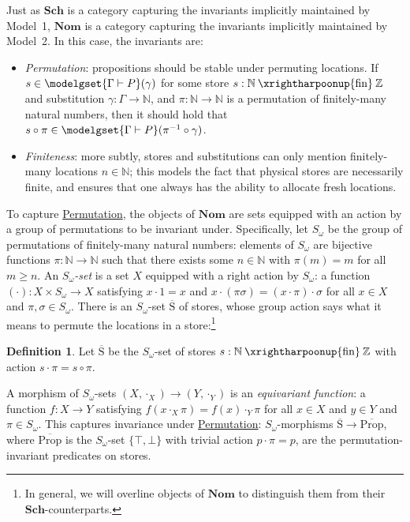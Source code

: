 \documentclass[
  sigconf,
  screen, ]{acmart}
\makeatletter
\theoremstyle{definition}
\newtheorem{definition}[theorem]{Definition}
\newcommand\N{\mathbb N}
\newcommand\Z{\mathbb Z}
\newcommand{\labelword}[2]{\phantomsection
  #1\def\@currentlabel{\unexpanded{#1}}\label{#2}}
\newcommand\nref[2]{\hyperref[#1]{#2}} \newcommand\checkhigh{{\huge{\color{red}\textbf{TODO: check}}}}
\newcommand\vtrue{\top}
\newcommand\vfalse{\bot}
\newcommand\Sch{{\nref{def:Sch}{\mathbf{Sch}}}}
\newcommand\nomgrp{{\nref{def:nomgrp}{S_\omega}}}
\newcommand\Nom{{\nref{def:Nom}{\mathbf{Nom}}}}
\newcommand\nomstore{\mathbin{\xrightharpoonup{\rm fin}}}
\newcommand\nomProp{{\nref{def:nomProp}{\overline{\mathrm{Prop}}}}}
\newcommand\nomStore{{\nref{def:nomStore}{\overline{\mathrm{S}}}}}
\makeatother
\begin{document}
Just as $\Sch$ is a category capturing the invariants
implicitly maintained by Model~1,
$\Nom$ is a category
capturing the invariants implicitly maintained
by Model~2.
In this case, the invariants are:
\newcommand\Permutation{{\nref{def:Permutation}{Permutation}}}
\newcommand\Finiteness{{\nref{def:Finiteness}{Finiteness}}}
\begin{itemize}[leftmargin=*]
  \item \emph{\labelword{Permutation}{def:Permutation}}:
    propositions should be stable under permuting locations.
    If $s\in\modelgset{\Gamma\vdash P}(\gamma)$
    for some store $s : \N\nomstore\Z$ and substitution $\gamma : \Gamma\to \N$,
    and $\pi : \N\to\N$ is a permutation of finitely-many natural numbers,
    then it should hold that $s\circ \pi \in \modelgset{\Gamma\vdash P}(\pi^{-1}\circ \gamma)$.
  \item \emph{\labelword{Finiteness}{def:Finiteness}}: more subtly,
    stores and substitutions
    can only mention finitely-many locations $n\in\N$;
    this models the fact that physical stores are necessarily finite,
    and ensures that one always has the ability to allocate fresh locations.
\end{itemize}
To capture \Permutation{}, the objects of $\Nom$
are sets equipped with an action by a group of permutations to be invariant under.
  \labelword{Specifically}{def:nomgrp}, let $\nomgrp$ be the
  group of permutations of finitely-many natural numbers:
  elements of $\nomgrp$ are bijective functions $\pi : \N\to\N$
  such that there exists some $n\in \N$
  with $\pi(m) = m$ for all $m\ge n$.
  An \emph{$\nomgrp$-set}
  is a set $X$ equipped with
  a right action by $\nomgrp$:
  a function $(\cdot) : X\times\nomgrp\to X$
  satisfying $x\cdot 1 = x$ and $x\cdot (\pi\sigma) = (x\cdot \pi)\cdot \sigma$
  for all $x\in X$ and $\pi,\sigma\in\nomgrp$.
There is an $\nomgrp$-set
$\nomStore$ of stores,
whose group action says what it means to
permute the locations in a store:\footnote{In general, we will overline
 objects of $\Nom$ to distinguish them
 from their $\Sch$-counterparts.
}
\begin{definition} \label{def:nomStore}
  Let $\nomStore$
  be the $\nomgrp$-set
  of stores $s : \N\nomstore\Z$
  with action
  $s\cdot \pi = s\circ \pi$.
\end{definition}
A morphism of $\nomgrp$-sets
$(X,\cdot_X)\to(Y,\cdot_Y)$
is an \emph{equivariant function}:
a function $f : X\to Y$
satisfying $f(x\cdot_X\pi) = f(x)\cdot_Y \pi$
for all $x\in X$ and $y\in Y$ and $\pi\in\nomgrp$.
This captures invariance under \Permutation{}:
$\nomgrp$-morphisms $\nomStore\to\nomProp$,
\labelword{where}{def:nomProp} $\nomProp$ is the $\nomgrp$-set 
$\{\vtrue,\vfalse\}$
with trivial action $p\cdot \pi = p$,
are the permutation-invariant predicates on stores.
\end{document}
